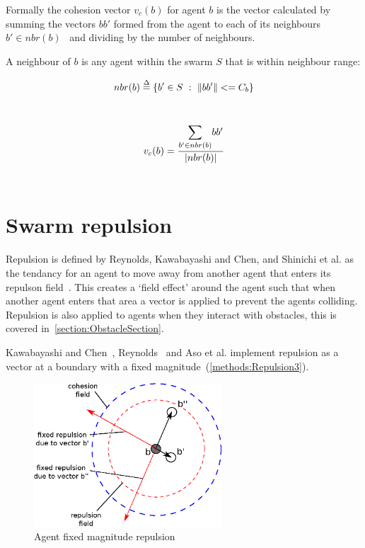 Formally the cohesion vector $v_{c}(b)$ for agent $b$ is the vector calculated by summing the vectors $bb'$ formed from the agent to each of its neighbours~$b' \in nbr(b)$~\cite{HAY:08} and dividing by the number of neighbours.


A neighbour of $b$ is any agent within the swarm $S$ that is within neighbour range:

\begin{equation}\label{eq:Neighbours1}
nbr(b) \buildrel \Delta \over = \{b' \in S~:~\magn{bb'} <= C_b\}
\end{equation}‎

\begin{equation}\label{eq:FlyToCentre1}
v_{c}(b) = \frac{\mathlarger{\sum_{b' \in nbr(b)}}{bb'}}{\card{nbr(b)}}
\end{equation}‎

\section{Swarm repulsion}\label{sec:Repulsion1}
Repulsion is defined by Reynolds, Kawabayashi and Chen, and Shinichi et al. as the tendancy for an agent to move away from another agent that enters its repulson field~\cite{REY:87, KC:08, AYSH:08}. This creates a `field effect' around the agent such that when another agent enters that area a vector is applied to prevent the agents colliding. Repulsion is also applied to agents when they interact with obstacles, this is covered in~\autoref{section:ObstacleSection}.

Kawabayashi and Chen~\cite{KC:08}, Reynolds~\cite{REY:87} and Aso et al. implement repulsion as a vector at a boundary with a fixed magnitude~(\autoref{methods:Repulsion3}). 

\begin{figure}[H]
\begin{center}
\includegraphics[width=7cm]{CHAPTER-2/figures/Repulsion3}
\caption{Agent fixed magnitude repulsion\label{methods:Repulsion3}}
\end{center}
\end{figure}

